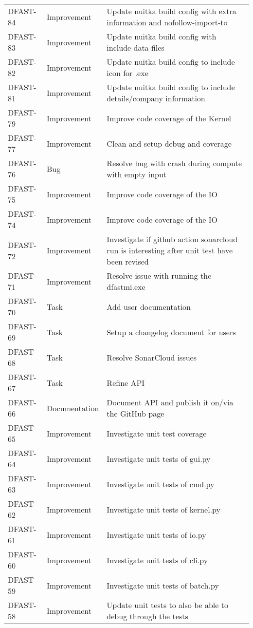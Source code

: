 \documentclass[git]{deltares_manual}
\begin{document}
\begin{longtable}{l|l|p{8cm}}
DFAST-84 & Improvement & Update nuitka build config with extra information and nofollow-import-to \\
DFAST-83 & Improvement & Update nuitka build config with include-data-files \\
DFAST-82 & Improvement & Update nuitka build config to include icon for .exe \\
DFAST-81 & Improvement & Update nuitka build config to include details/company information \\
DFAST-79 & Improvement & Improve code coverage of the Kernel  \\
DFAST-77 & Improvement & Clean and setup debug and coverage \\
DFAST-76 & Bug & Resolve bug with crash during compute with empty input \\
DFAST-75 & Improvement & Improve code coverage of the IO \\
DFAST-74 & Improvement & Improve code coverage of the IO  \\
DFAST-72 & Improvement & Investigate if github action sonarcloud run is interesting after unit test have been revised \\
DFAST-71 & Improvement & Resolve issue with running the dfastmi.exe \\
DFAST-70 & Task & Add user documentation \\
DFAST-69 & Task & Setup a changelog document for users \\
DFAST-68 & Task & Resolve SonarCloud issues \\
DFAST-67 & Task & Refine API \\
DFAST-66 & Documentation & Document API and publish it on/via the GitHub page \\
DFAST-65 & Improvement & Investigate unit test coverage \\
DFAST-64 & Improvement & Investigate unit tests of gui.py \\
DFAST-63 & Improvement & Investigate unit tests of cmd.py \\
DFAST-62 & Improvement & Investigate unit tests of kernel.py \\
DFAST-61 & Improvement & Investigate unit tests of io.py \\
DFAST-60 & Improvement &  Investigate unit tests of cli.py \\
DFAST-59 & Improvement & Investigate unit tests of batch.py \\
DFAST-58 & Improvement & Update unit tests to also be able to debug through the tests \\

\end{longtable}
\end{document}

